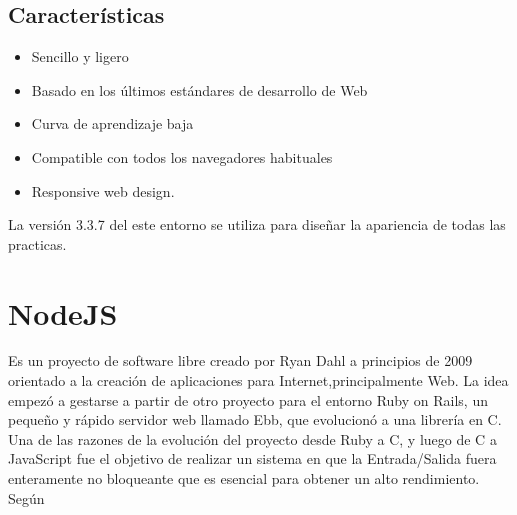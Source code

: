 \subsection*{Características}
\begin{itemize}
\item Sencillo y ligero
\item Basado en los últimos estándares de desarrollo de Web
\item Curva de aprendizaje baja
\item Compatible con todos los navegadores habituales
\item Responsive web design.
\end{itemize}
La versión 3.3.7 del este entorno se utiliza para diseñar la apariencia de todas las practicas.
\section{NodeJS}
Es un proyecto de software libre creado por Ryan Dahl a principios de 2009  orientado a la creación de aplicaciones para Internet,principalmente Web. La idea empezó a gestarse a partir de otro proyecto para el entorno Ruby on Rails, un pequeño y rápido servidor web llamado Ebb, que evolucionó a una librería en C.
\\Una de las razones de la evolución del proyecto desde Ruby a C, y luego de C a JavaScript fue el objetivo de realizar un sistema en que la Entrada/Salida fuera enteramente no bloqueante que es esencial para obtener un alto rendimiento. Según \cite{nodejs}
